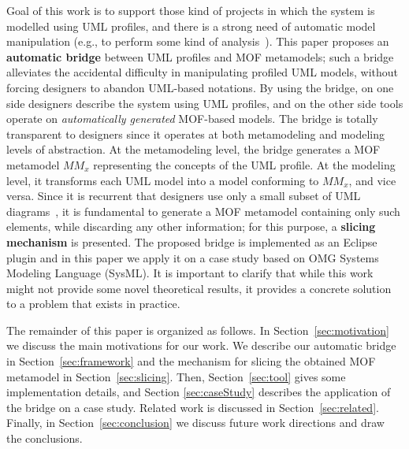 Goal of this work is to support those kind of projects in which the system is modelled using UML profiles, and there is a strong need of automatic model manipulation (e.g., to perform some kind of analysis~\cite{UMLprofilesAnalysis}).
This paper proposes an \textbf{automatic bridge} between UML profiles and MOF metamodels; such a bridge alleviates the accidental difficulty in manipulating profiled UML models, without forcing designers to abandon UML-based notations.
By using the bridge, on one side designers describe the system using UML profiles, and on the other side tools operate
on \textit{automatically generated} MOF-based models.
The bridge is totally transparent to designers since it operates at both metamodeling and modeling levels of abstraction.
At the metamodeling level, the bridge generates a MOF metamodel $MM_x$ representing the concepts of the UML profile.
At the modeling level, it transforms each UML model into a model conforming to $MM_x$, and vice versa.
Since it is recurrent that designers use only a small subset of UML diagrams~\cite{france},
it is fundamental to generate a MOF metamodel containing only such elements, while discarding any other information; for this purpose, a \textbf{slicing mechanism} is presented. The proposed bridge is implemented as an Eclipse plugin and in this paper we apply it
on a case study based on OMG Systems Modeling Language (SysML). It is important to clarify that while this work might not provide some novel theoretical results, it provides a concrete solution to a problem that exists in practice.

The remainder of this paper is organized as follows. In Section~\ref{sec:motivation} we discuss the main motivations for our work.
We describe our automatic bridge in Section~\ref{sec:framework} and the mechanism for slicing the obtained MOF metamodel
in Section~\ref{sec:slicing}. Then, Section~\ref{sec:tool} gives some implementation details, and Section \ref{sec:caseStudy} describes the application of the bridge on a case study. Related work is discussed in Section~\ref{sec:related}. 
Finally, in Section~\ref{sec:conclusion} we discuss future work directions and draw the conclusions.
